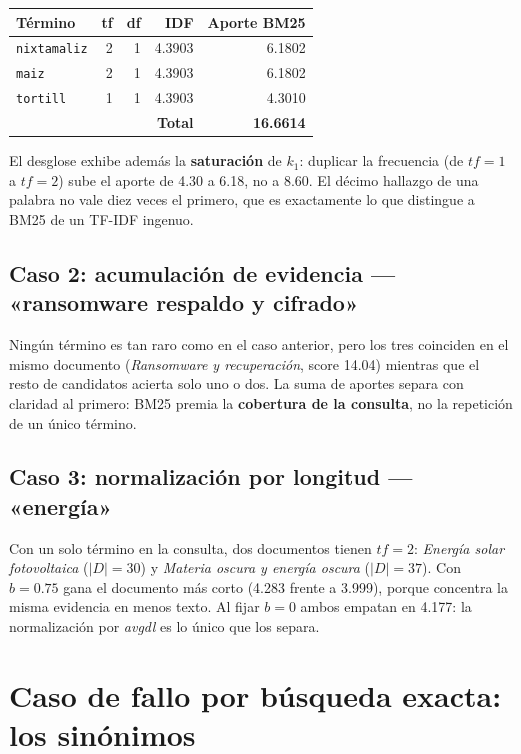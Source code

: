\documentclass[10pt,a4paper]{article}
\newcommand{\term}[1]{\textcolor{acento}{\texttt{#1}}}
\begin{document}
\begin{table}[h]
\centering\small
\begin{tabular}{lrrrr}
\toprule
\textbf{Término} & \textbf{tf} & \textbf{df} & \textbf{IDF} & \textbf{Aporte BM25} \\
\midrule
\term{nixtamaliz} & 2 & 1 & 4.3903 & 6.1802 \\
\term{maiz}       & 2 & 1 & 4.3903 & 6.1802 \\
\term{tortill}    & 1 & 1 & 4.3903 & 4.3010 \\
\midrule
\multicolumn{4}{r}{\textbf{Total}} & \textbf{16.6614} \\
\bottomrule
\end{tabular}
\end{table}

El desglose exhibe además la \textbf{saturación} de $k_1$: duplicar la frecuencia (de $tf=1$ a
$tf=2$) sube el aporte de 4.30 a 6.18, no a 8.60. El décimo hallazgo de una palabra no vale diez
veces el primero, que es exactamente lo que distingue a BM25 de un TF-IDF ingenuo.

\subsection*{Caso 2: acumulación de evidencia — «ransomware respaldo y cifrado»}

Ningún término es tan raro como en el caso anterior, pero los tres coinciden en el mismo documento
(\emph{Ransomware y recuperación}, score 14.04) mientras que el resto de candidatos acierta solo
uno o dos. La suma de aportes separa con claridad al primero: BM25 premia la
\textbf{cobertura de la consulta}, no la repetición de un único término.

\subsection*{Caso 3: normalización por longitud — «energía»}

Con un solo término en la consulta, dos documentos tienen $tf=2$: \emph{Energía solar fotovoltaica}
($|D|=30$) y \emph{Materia oscura y energía oscura} ($|D|=37$). Con $b=0.75$ gana el documento más
corto (4.283 frente a 3.999), porque concentra la misma evidencia en menos texto. Al fijar $b=0$
ambos empatan en 4.177: la normalización por \emph{avgdl} es lo único que los separa.

\section{Caso de fallo por búsqueda exacta: los sinónimos}
\end{document}
